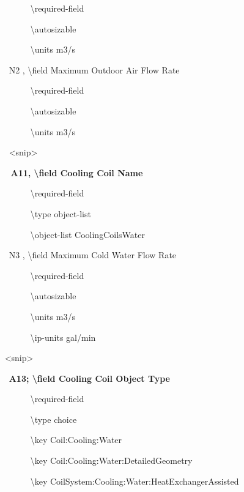 ~~~~~~~ \textbackslash{}required-field

~~~~~~~ \textbackslash{}autosizable

~~~~~~~ \textbackslash{}units m3/s

~~ N2 , \textbackslash{}field Maximum Outdoor Air Flow Rate

~~~~~~~ \textbackslash{}required-field

~~~~~~~ \textbackslash{}autosizable

~~~~~~~ \textbackslash{}units m3/s

~~ \textless{}snip\textgreater{}

\textbf{~~ A11, \textbackslash{}field Cooling Coil Name}

~~~~~~~ \textbackslash{}required-field

~~~~~~~ \textbackslash{}type object-list

~~~~~~~ \textbackslash{}object-list CoolingCoilsWater

~~ N3 , \textbackslash{}field Maximum Cold Water Flow Rate

~~~~~~~ \textbackslash{}required-field

~~~ ~~~~\textbackslash{}autosizable

~~~~~~~ \textbackslash{}units m3/s

~~~~~~~ \textbackslash{}ip-units gal/min

~ \textless{}snip\textgreater{}

~~ \textbf{A13; \textbackslash{}field Cooling Coil Object Type}

~~~~~~~ \textbackslash{}required-field

~~~~~~~ \textbackslash{}type choice

~~~~~~~ \textbackslash{}key Coil:Cooling:Water

~~~~~~~ \textbackslash{}key Coil:Cooling:Water:DetailedGeometry

~~~~~~~ \textbackslash{}key CoilSystem:Cooling:Water:HeatExchangerAssisted
